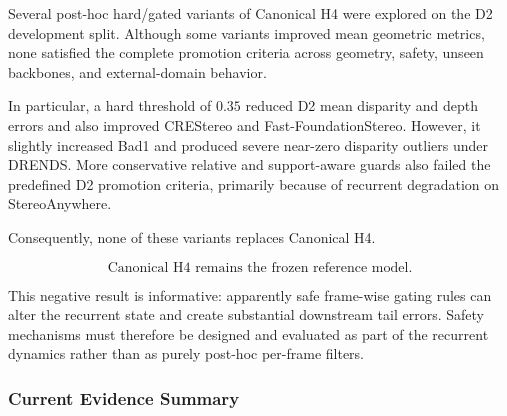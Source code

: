 \documentclass[11pt,a4paper]{article}
\begin{document}
Several post-hoc hard/gated variants of Canonical H4 were explored on
the D2 development split.
Although some variants improved mean geometric metrics, none satisfied
the complete promotion criteria across geometry, safety, unseen
backbones, and external-domain behavior.

In particular, a hard threshold of $0.35$ reduced D2 mean disparity and
depth errors and also improved CREStereo and Fast-FoundationStereo.
However, it slightly increased Bad1 and produced severe near-zero
disparity outliers under DRENDS.
More conservative relative and support-aware guards also failed the
predefined D2 promotion criteria, primarily because of recurrent
degradation on StereoAnywhere.

Consequently, none of these variants replaces Canonical H4.

\[
\boxed{
\text{Canonical H4 remains the frozen reference model.}
}
\]

This negative result is informative: apparently safe frame-wise gating
rules can alter the recurrent state and create substantial downstream
tail errors.
Safety mechanisms must therefore be designed and evaluated as part of
the recurrent dynamics rather than as purely post-hoc per-frame filters.


\subsubsection{Current Evidence Summary}
\end{document}
